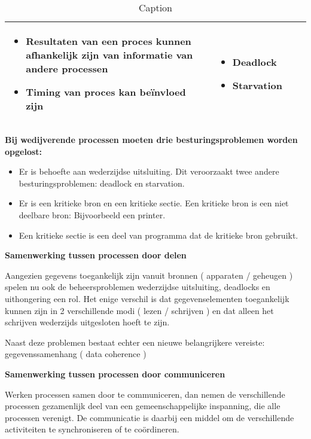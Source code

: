 \begin{landscape}
\begin{table}[htb]
\begin{center}
\begin{tabular}{ | p{5cm} | p{3cm} | p{7cm} | p{6cm} |}
\begin{itemize}
       \item Resultaten van een proces kunnen afhankelijk zijn van informatie van andere processen
       \item Timing van proces kan beïnvloed zijn
   \end{itemize} & \begin{itemize}
       \item Deadlock
       \item Starvation
   \end{itemize} \\ \hline
    \end{tabular}
\end{center}

    \caption{Caption}
    \label{tab:my_label}
\end{table}

\end{landscape}


\textbf{Bij wedijverende processen moeten drie besturingsproblemen worden opgelost:}

\begin{itemize}
\item Er is behoefte aan wederzijdse uitsluiting. Dit veroorzaakt twee andere besturingsproblemen: deadlock en starvation.
\item Er is een kritieke bron en een kritieke sectie. Een kritieke bron is een niet deelbare bron: Bijvoorbeeld een printer.
\item Een kritieke sectie is een deel van programma dat de kritieke bron gebruikt.
\end{itemize}

\textbf{Samenwerking tussen processen door delen}

Aangezien gegevens toegankelijk zijn vanuit bronnen ( apparaten / geheugen ) spelen nu ook de beheersproblemen wederzijdse uitsluiting, deadlocks en uithongering een rol. Het enige verschil is dat gegevenselementen toegankelijk kunnen zijn in 2 verschillende modi ( lezen / schrijven ) en dat alleen het schrijven wederzijds uitgesloten hoeft te zijn.

Naast deze problemen bestaat echter een nieuwe belangrijkere vereiste: gegevenssamenhang ( data coherence )

\textbf{Samenwerking tussen processen door communiceren}

Werken processen samen door te communiceren, dan nemen de verschillende processen gezamenlijk deel van een gemeenschappelijke inspanning, die alle processen verenigt. De communicatie is daarbij een middel om de verschillende activiteiten te synchroniseren of te coördineren.

